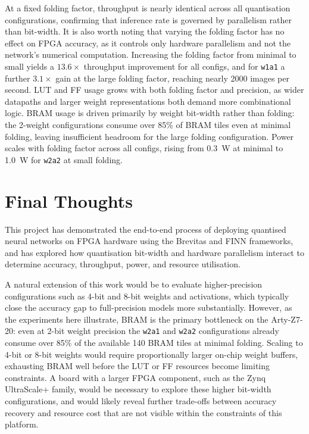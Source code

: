 \documentclass[11pt]{article}
\begin{document}
At a fixed folding factor, throughput is nearly identical across all quantisation configurations, confirming that inference rate is governed by parallelism rather than bit-width.
It is also worth noting that varying the folding factor has no effect on FPGA accuracy, as it controls only hardware parallelism and not the network's numerical computation.
Increasing the folding factor from minimal to small yields a $13.6\times$ throughput improvement for all configs, and for \texttt{w1a1} a further $3.1\times$ gain at the large folding factor, reaching nearly 2000 images per second.
LUT and FF usage grows with both folding factor and precision, as wider datapaths and larger weight representations both demand more combinational logic.
BRAM usage is driven primarily by weight bit-width rather than folding: the 2-weight configurations consume over 85\% of BRAM tiles even at minimal folding, leaving insufficient headroom for the large folding configuration.
Power scales with folding factor across all configs, rising from \SI{0.3}{\watt} at minimal to \SI{1.0}{\watt} for \texttt{w2a2} at small folding.

\section{Final Thoughts}
This project has demonstrated the end-to-end process of deploying quantised neural networks on FPGA hardware using the Brevitas and FINN frameworks, and has explored how quantisation bit-width and hardware parallelism interact to determine accuracy, throughput, power, and resource utilisation.

A natural extension of this work would be to evaluate higher-precision configurations such as 4-bit and 8-bit weights and activations, which typically close the accuracy gap to full-precision models more substantially.
However, as the experiments here illustrate, BRAM is the primary bottleneck on the Arty-Z7-20: even at 2-bit weight precision the \texttt{w2a1} and \texttt{w2a2} configurations already consume over 85\% of the available 140 BRAM tiles at minimal folding.
Scaling to 4-bit or 8-bit weights would require proportionally larger on-chip weight buffers, exhausting BRAM well before the LUT or FF resources become limiting constraints.
A board with a larger FPGA component, such as the Zynq UltraScale+ family, would be necessary to explore these higher bit-width configurations, and would likely reveal further trade-offs between accuracy recovery and resource cost that are not visible within the constraints of this platform.

\newpage
{}

\end{document}
